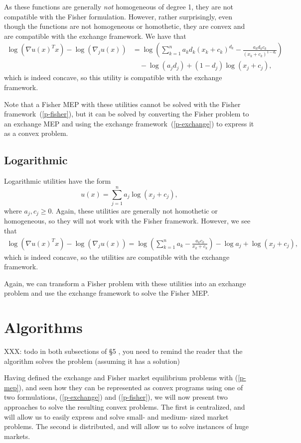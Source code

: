 \documentclass[12pt]{article}
\begin{document}
As these functions are generally \emph{not} homogeneous of degree 1,
they are not compatible with the Fisher formulation.
However, rather surprisingly, even though the
functions are not homogeneous or homothetic, they are
convex and are compatible with the exchange framework.
We have that
\begin{align*}
\log(\nabla u(x)^T x) - \log(\nabla_j u(x))
&= \log\left(\sum_{k=1}^n a_k d_k (x_k+c_k)^{d_k} - \frac{a_k d_k c_k}{(x_k + c_k)^{1-d_k}} \right)\\
&\quad- \log(a_j d_j) + (1-d_j)\log (x_j + c_j),
\end{align*}
which is indeed concave, so this utility is compatible with
the exchange framework.

Note that a Fisher MEP with these utilities cannot be solved with the Fisher
framework~(\ref{p-fisher}), but it can be solved by converting the Fisher
problem to an exchange MEP and using the exchange framework~(\ref{p-exchange})
to express it as a convex problem.


\subsection{Logarithmic}
Logarithmic utilities have the form
\[
u(x) = \sum_{j=1}^n a_j \log(x_j+ c_j),
\]
where $a_j, c_j \geq 0$.
Again, these utilities are generally not homothetic or
homogeneous, so they will not work with the Fisher framework.
However, we see that 
\begin{align*}
\log(\nabla u(x)^T x) - \log(\nabla_j u(x)) =
\log\left(\sum_{k=1}^n a_k - \frac{a_k c_k}{x_k+c_k} \right) - \log a_j + \log (x_j + c_j),
\end{align*}
which is indeed concave, so the utilities are compatible
with the exchange framework.

Again, we can transform a Fisher problem with these utilities into
an exchange problem and use the exchange framework to solve
the Fisher MEP.

\section{Algorithms}
\label{sec:algorithms}

XXX: todo in both subsections of \S5 , you need to remind the reader that the
algorithm solves the problem (assuming it has a solution)

Having defined the exchange and Fisher market equilibrium problems with
(\ref{p-mep}), and seen how they can be represented as convex programs using
one of two formulations, (\ref{p-exchange}) and (\ref{p-fisher}), we will now
present two approaches to solve the resulting convex problems. The first is
centralized, and will allow us to easily express and solve small- and medium-
sized market problems. The second is distributed, and will allow us to solve
instances of huge markets.
\end{document}
